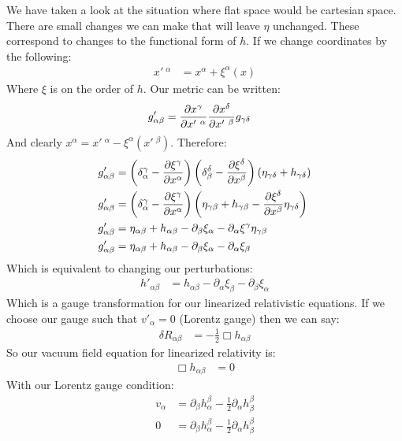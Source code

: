 We have taken a look at the situation where flat space would be cartesian space. There are small changes we can make that will leave $\eta$ unchanged. These correspond to changes to the functional form of $h$.
If we change coordinates by the following:
\begin{align*}
	x'\ ^\alpha &= x^\alpha + \xi^\alpha(x)
\end{align*}
Where $\xi$ is on the order of $h$. Our metric can be written:
\begin{align*}
	g'_{\alpha\beta} &= \frac{\partial x^\gamma}{\partial x'\ ^\alpha} \frac{\partial x^\delta}{\partial x'\ ^\beta} g_{\gamma\delta}
\end{align*}
And clearly $x^\alpha = x'\ ^\alpha - \xi^\alpha(x'\ ^\beta)$. Therefore:
\begin{align*}
	g'_{\alpha\beta} &= \left(\delta_\alpha^\gamma -\frac{\partial \xi^\gamma}{\partial x^\alpha}\right)\left(\delta_\beta^\delta - \frac{\partial \xi^\delta}{\partial x^\beta}\right)(\eta_{\gamma\delta} + h_{\gamma\delta}) \\
	g'_{\alpha\beta} &= \left(\delta_\alpha^\gamma -\frac{\partial \xi^\gamma}{\partial x^\alpha}\right)\left(\eta_{\gamma\beta} +h_{\gamma\beta} - \frac{\partial \xi^\delta}{\partial x^\beta}\eta_{\gamma\delta}\right) \\
	g'_{\alpha\beta} &= \eta_{\alpha\beta} + h_{\alpha\beta} - \partial_\beta \xi_\alpha - \partial_\alpha\xi^\gamma\eta_{\gamma\beta} \\
	g'_{\alpha\beta} &= \eta_{\alpha\beta} + h_{\alpha\beta} - \partial_\beta \xi_\alpha - \partial_\alpha\xi_\beta
\end{align*}
Which is equivalent to changing our perturbations:
\begin{align*}
	h'_{\alpha\beta} &= h_{\alpha\beta} - \partial_\alpha\xi_\beta - \partial_\beta\xi_\alpha
\end{align*}
Which is a gauge transformation for our linearized relativistic equations. If we choose our gauge such that $v'_\alpha =0$ (Lorentz gauge) then we can say:
\begin{align*}
	\delta R_{\alpha\beta} &= -\frac{1}{2} \Box h_{\alpha\beta}
\end{align*}
So our vacuum field equation for linearized relativity is:
\begin{align*}
	\Box h_{\alpha\beta} &= 0
\end{align*}
With our Lorentz gauge condition:
\begin{align*}
	v_\alpha &= \partial_\beta h^\beta_\alpha - \frac{1}{2} \partial_\alpha h^\beta_\beta \\
	0 &= \partial_\beta h^\beta_\alpha - \frac{1}{2} \partial_\alpha h^\beta_\beta
\end{align*}

